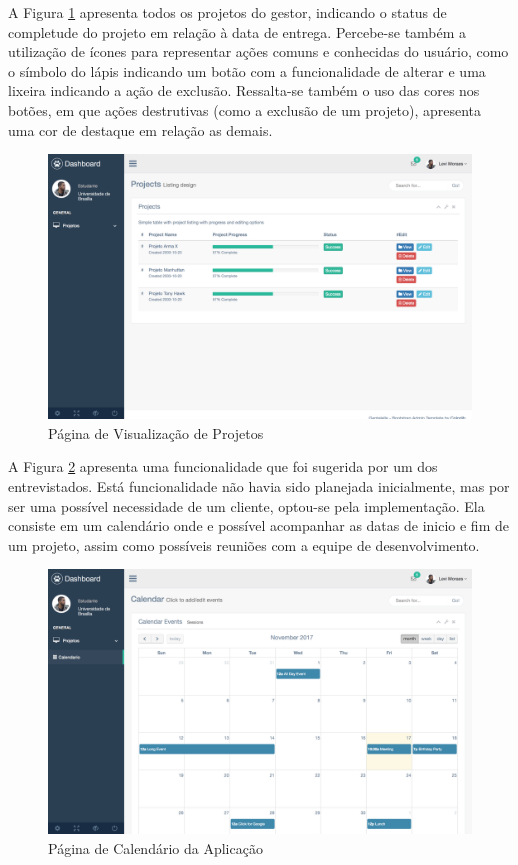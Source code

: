 A Figura \ref{img:pag_visual} apresenta todos os projetos do gestor, indicando o status de completude do projeto em relação à data de entrega. Percebe-se também a utilização de ícones para representar ações comuns e conhecidas do usuário, como o símbolo do lápis indicando um botão com a funcionalidade de alterar e uma lixeira indicando a ação de exclusão. Ressalta-se também o uso das cores nos botões, em que ações destrutivas (como a exclusão de um projeto), apresenta uma cor de destaque em relação as demais.


\graphicspath{{figuras/}}
\begin{figure}[h]
\centering
\includegraphics[scale=0.35]{visualizacao_projetos}
\caption{Página de Visualização de Projetos}
\label{img:pag_visual}
\end{figure}

A Figura \ref{img:pag_calendario} apresenta uma funcionalidade que foi sugerida por um dos entrevistados. Está funcionalidade não havia sido planejada inicialmente, mas por ser uma possível necessidade de um cliente, optou-se pela implementação. Ela consiste em um calendário onde e possível acompanhar as datas de inicio e fim de um projeto, assim como possíveis reuniões com a equipe de desenvolvimento.

\graphicspath{{figuras/}}
\begin{figure}[h]
\centering
\includegraphics[scale=0.35]{calendario}
\caption{Página de Calendário da Aplicação}
\label{img:pag_calendario}
\end{figure}

